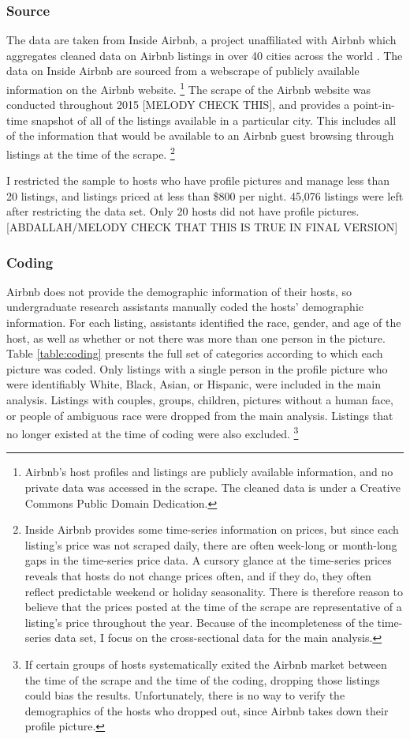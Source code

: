 \subsubsection*{Source} 
The data are taken from Inside Airbnb, a project unaffiliated with Airbnb which aggregates cleaned data on Airbnb listings in over 40 cities across the world \citep{insideairbnb}. The data on Inside Airbnb are sourced from a webscrape of publicly available information on the Airbnb website.%
	\footnote{Airbnb's host profiles and listings are publicly available information, and no private data was accessed in the scrape. The cleaned data is under a Creative Commons Public Domain Dedication.} 
The scrape of the Airbnb website was conducted throughout 2015 [MELODY CHECK THIS], and provides a point-in-time snapshot of all of the listings available in a particular city. This includes all of the information that would be available to an Airbnb guest browsing through listings at the time of the scrape.%
	\footnote{Inside Airbnb provides some time-series information on prices, but since each listing's price was not scraped daily, there are often week-long or month-long gaps in the time-series price data. A cursory glance at the time-series prices reveals that hosts do not change prices often, and if they do, they often reflect predictable weekend or holiday seasonality. There is therefore reason to believe that the prices posted at the time of the scrape are representative of a listing's price throughout the year. Because of the incompleteness of the time-series data set, I focus on the cross-sectional data for the main analysis.} 
	
I restricted the sample to hosts who have profile pictures and manage less than 20 listings, and listings priced at less than \$800 per night. 45,076 listings were left after restricting the data set. Only 20 hosts did not have profile pictures. [ABDALLAH/MELODY CHECK THAT THIS IS TRUE IN FINAL VERSION]

\subsubsection*{Coding} 
Airbnb does not provide the demographic information of their hosts, so undergraduate research assistants manually coded the hosts' demographic information. For each listing, assistants identified the race, gender, and age of the host, as well as whether or not there was more than one person in the picture. Table \ref{table:coding} presents the full set of categories according to which each picture was coded. Only listings with a single person in the profile picture who were identifiably White, Black, Asian, or Hispanic, were included in the main analysis. Listings with couples, groups, children, pictures without a human face, or people of ambiguous race were dropped from the main analysis. Listings that no longer existed at the time of coding were also excluded.%
	\footnote{If certain groups of hosts systematically exited the Airbnb market between the time of the scrape and the time of the coding, dropping those listings could bias the results. Unfortunately, there is no way to verify the demographics of the hosts who dropped out, since Airbnb takes down their profile picture.}
		
